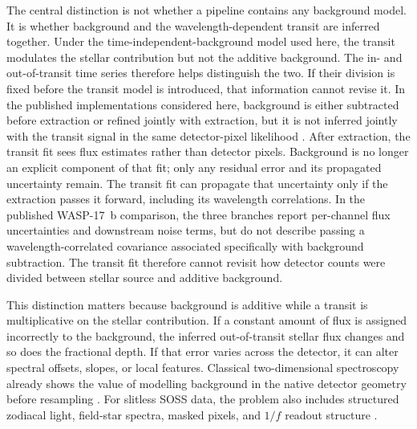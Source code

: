 The central distinction is not whether a pipeline contains any background
model. It is whether background and the wavelength-dependent transit are
inferred together. Under the time-independent-background model used here, the
transit modulates the stellar contribution but not the additive background.
The in- and out-of-transit time series therefore helps distinguish the two. If
their division is fixed before the transit model is introduced, that
information cannot revise it. In the published implementations considered
here, background is either subtracted before extraction or refined jointly
with extraction, but it is not inferred jointly with the transit signal in the
same detector-pixel likelihood
\citep{HolmbergMadhusudhan2023,LouieEtAl2025}. After extraction, the transit
fit sees flux estimates rather than detector pixels. Background is no longer
an explicit component of that fit; only any residual error and its propagated
uncertainty remain. The transit fit can propagate that uncertainty only if the
extraction passes it forward, including its wavelength correlations. In the
published WASP-17~b comparison, the three branches report per-channel flux
uncertainties and downstream noise terms, but do not describe passing a
wavelength-correlated covariance associated specifically with background
subtraction. The transit fit therefore cannot revisit how detector counts were
divided between stellar source and additive background.

This distinction matters because background is additive while a transit is
multiplicative on the stellar contribution. If a constant amount of flux is
assigned incorrectly to the background, the inferred out-of-transit stellar
flux changes and so does the fractional depth. If that error varies across the
detector, it can alter spectral offsets, slopes, or local features. Classical
two-dimensional spectroscopy already shows the value of modelling background
in the native detector geometry before resampling
\citep{Kelson2003}. For slitless SOSS data, the problem also includes structured
zodiacal light, field-star spectra, masked pixels, and $1/f$ readout structure
\citep{RadicaEtAl2023,HolmbergMadhusudhan2023}.


